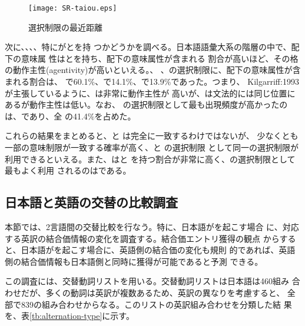 \documentclass[japanese]{jnlp}
\newcommand{\izs}[1]{}
\newcommand{\izj}[1]{}
\newcommand{\abs}{}
\newcommand{\sbj}{}
\newcommand{\obj}{}
\newcommand{\soalt}{}
\newcommand{\citet}{}
\begin{document}
\begin{figure}[h]
\begin{center}
\texttt{[image: SR-taiou.eps]}
\caption{選択制限の最近距離}
\label{fig:sr-diff}
\end{center}
\end{figure}


次に、\abs{}、\obj{}、\sbj{}、特に\abs{}が\izs{意識}と\izs{意志性}を持
つかどうかを調べる。日本語語彙大系の階層の中で、\izj{主体}配下の意味属
性は\izs{意識}と\izs{意志性}を持ち、\izj{主体}配下の意味属性が含まれる
割合が高いほど、その格の動作主性(agentivity)が高いといえる。\abs{}、
\obj{}、\sbj{}の選択制限に、\izj{主体}配下の意味属性が含まれる割合は、
\abs{}で60.1\%、\obj{}で14.1\%、\sbj{}で13.9\%であった。つまり、
\citet{Kilgarriff:1993} が主張しているように、\abs{}は非常に動作主性が
高いが、\sbj{}は文法的には同じ位置にあるが動作主性は低い。なお、\abs{}
の選択制限として最も出現頻度が高かったのは、\izj{主体}であり、全\abs{}
の41.4\%を占めた。



これらの結果をまとめると、\sbj と \obj は完全に一致するわけではないが、
少なくとも一部の意味制限が一致する確率が高く、\sbj と \obj の選択制限
として同一の選択制限が利用できるといえる。また、\abs{}は\izs{意識}と
\izs{意志性}を持つ割合が非常に高く、\abs{}の選択制限として最もよく利用
されるのは\izj{主体}である。



\subsection{日本語と英語の交替の比較調査}\label{sec:alternations}


本節では、2言語間の交替比較を行なう。特に、日本語が\soalt を起こす場合
に、対応する英訳の結合価情報の変化を調査する。結合価エントリ獲得の観点
からすると、日本語が\soalt を起こす場合に、英語側の結合価の変化も規則
的であれば、英語側の結合価情報も日本語側と同時に獲得が可能であると予測
できる。

この調査には、交替動詞リストを用いる。交替動詞リストは日本語は460組み
合わせだが、多くの動詞は英訳が複数あるため、英訳の異なりを考慮すると、
全部で839の組み合わせからなる。このリストの英訳組み合わせを分類した結
果を、表\ref{tb:alternation-type}に示す。
\end{document}
